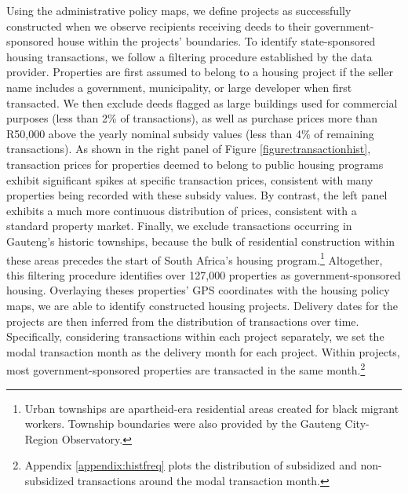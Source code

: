 \documentclass[12pt]{article}
\begin{document}
 Using the administrative policy maps, we define projects as successfully constructed when we observe recipients receiving deeds to their government-sponsored house within the projects' boundaries. To identify state-sponsored housing transactions, we follow a filtering procedure established by the data provider. Properties are first assumed to belong to a housing project if the seller name includes a government, municipality, or large developer when first transacted. 
 We then exclude deeds flagged as large buildings used for commercial purposes (less than 2\% of transactions), as well as purchase prices more than R50,000 above the yearly nominal subsidy values (less than 4\% of remaining transactions). As shown in the right panel of Figure \ref{figure:transactionhist}, transaction prices for properties deemed to belong to public housing programs exhibit significant spikes at specific transaction prices, consistent with many properties being recorded with these subsidy values.  By contrast, the left panel exhibits a much more continuous distribution of prices, consistent with a standard property market.  Finally, we exclude transactions occurring in Gauteng's historic townships, because the bulk of residential construction within these areas precedes the start of South Africa's housing program.\footnote{Urban townships are apartheid-era residential areas created for black migrant workers. Township boundaries were also provided by the Gauteng City-Region Observatory.} Altogether, this filtering procedure identifies over 127,000 properties as government-sponsored housing. Overlaying theses properties' GPS coordinates with the housing policy maps, we are able to identify constructed housing projects. Delivery dates for the projects are then inferred from the distribution of transactions over time. Specifically, considering transactions within each project separately, we set the modal transaction month as the delivery month for each project. Within projects, most government-sponsored properties are transacted in the same month.\footnote{Appendix \ref{appendix:histfreq} plots the distribution of subsidized and non-subsidized transactions around the modal transaction month.} %
\end{document}
